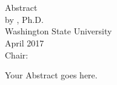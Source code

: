 \label{chap:chapter-1}

\begin{center}
	\begin{singlespace}
		\label{ssec:abstract}

		\MakeUppercase{\mytitleA}\\
    	\bigskip
    	\MakeUppercase{\mytitleB}\\
		\bigskip
		Abstract\\
		\bigskip \bigskip \bigskip
		by \myname, Ph.D.\\
		Washington State University\\
		April 2017\\
		\bigskip \bigskip \bigskip
		Chair: \mychair	
	\end{singlespace}
\end{center}
  

Your Abstract goes here.


\newpage
